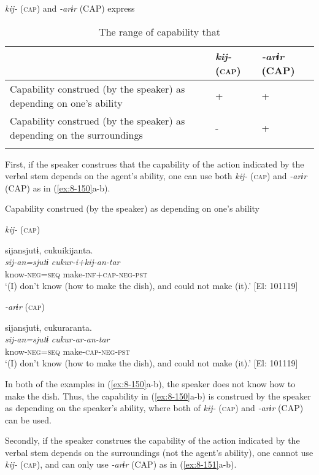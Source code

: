 \begin{table}
\caption{\label{tab:key:91}The range of capability that} \textmd{\textit{kij-}}\textmd{ (\textsc{cap}) and} \textmd{\textit{-arɨr}}\textmd{ (CAP) express}
\begin{tabular}{lll}
\lsptoprule
  &\textit{kij-} (\textsc{cap}) & \textit{-arɨr} (CAP)\\
  \midrule
  Capability construed (by the speaker) as depending on one’s ability & + & +\\
Capability construed (by the speaker) as depending on the surroundings & - & +\\
\lspbottomrule
\end{tabular}
\end{table}

First, if the speaker construes that the capability of the action indicated by the verbal stem depends on the agent’s ability, one can use both \textit{kij-} (\textsc{cap}) and \textit{-arɨr} (CAP) as in (\ref{ex:8-150}a-b).

\ea\label{ex:8-150}
  Capability construed (by the speaker) as depending on one’s ability

\ea \textit{kij-} (\textsc{cap})

  {\TM}
\glll  sijansjutɨ,  cukuikijanta.\\
\textit{sij-an=sjutɨ}  \textit{cukur-i+kij-an-tar}\\
    know-\textsc{neg}=\textsc{seq}  make-\textsc{inf}+\textsc{cap}-\textsc{neg}-\textsc{pst}\\
\glt ‘(I) don’t know (how to make the dish), and could not make (it).’ [El: 101119]


\ex \textit{-arɨr} (\textsc{cap})

  {\TM}
\glll  sijansjutɨ,  cukuraranta.\\
\textit{sij-an=sjutɨ}  \textit{cukur-ar-an-tar}\\
    know-\textsc{neg}=\textsc{seq}  make-\textsc{cap}-\textsc{neg}-\textsc{pst}\\
\glt ‘(I) don’t know (how to make the dish), and could not make (it).’ [El: 101119]
\z
\z

In both of the examples in (\ref{ex:8-150}a-b), the speaker does not know how to make the dish. Thus, the capability in (\ref{ex:8-150}a-b) is construed by the speaker as depending on the speaker’s ability, where both of \textit{kij-} (\textsc{cap}) and \textit{-arɨr} (CAP) can be used.

Secondly, if the speaker construes the capability of the action indicated by the verbal stem depends on the surroundings (not the agent’s ability), one cannot use \textit{kij-} (\textsc{cap}), and can only use \textit{-arɨr} (CAP) as in (\ref{ex:8-151}a-b).

